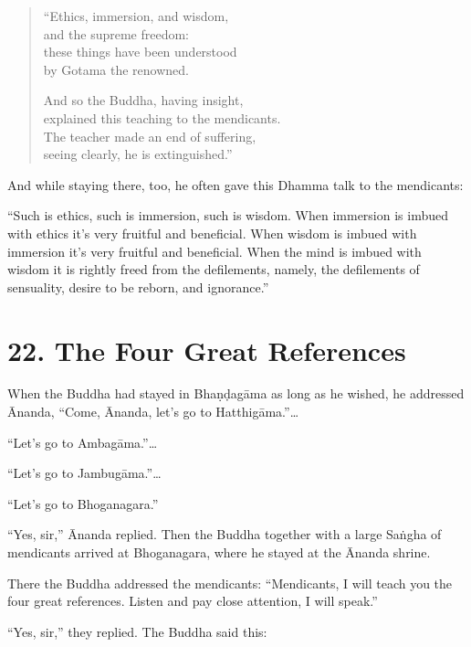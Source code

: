 \documentclass[12pt,openany]{book}%
\begin{document}
\begin{verse}%
“Ethics, immersion, and wisdom, \\
and the supreme freedom: \\
these things have been understood \\
by Gotama the renowned. 

And so the Buddha, having insight, \\
explained this teaching to the mendicants. \\
The teacher made an end of suffering, \\
seeing clearly, he is extinguished.” 

%
\end{verse}

And while staying there, too, he often gave this Dhamma talk to the mendicants: 

“Such is ethics, such is immersion, such is wisdom. When immersion is imbued with ethics it’s very fruitful and beneficial. When wisdom is imbued with immersion it’s very fruitful and beneficial. When the mind is imbued with wisdom it is rightly freed from the defilements, namely, the defilements of sensuality, desire to be reborn, and ignorance.” 

\section*{22. The Four Great References }

When the Buddha had stayed in \textsanskrit{Bhaṇḍagāma} as long as he wished, he addressed Ānanda, “Come, Ānanda, let’s go to \textsanskrit{Hatthigāma}.”… 

“Let’s go to \textsanskrit{Ambagāma}.”… 

“Let’s go to \textsanskrit{Jambugāma}.”… 

“Let’s go to Bhoganagara.” 

“Yes, sir,” Ānanda replied. Then the Buddha together with a large \textsanskrit{Saṅgha} of mendicants arrived at Bhoganagara, where he stayed at the Ānanda shrine. 

There the Buddha addressed the mendicants: “Mendicants, I will teach you the four great references. Listen and pay close attention, I will speak.” 

“Yes, sir,” they replied. The Buddha said this: 
\end{document}
